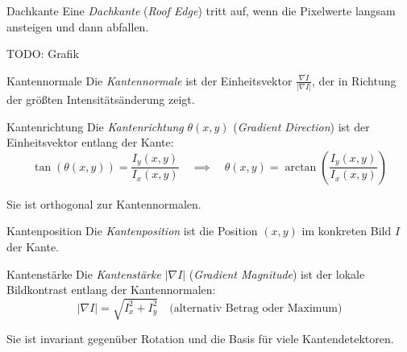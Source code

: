 \begin{example}[Kante]{Dachkante}
    Eine \emph{Dachkante} (\emph{Roof Edge}) tritt auf, wenn die Pixelwerte langsam ansteigen und dann abfallen.

    TODO: Grafik
\end{example}

\begin{defi}{Kantennormale}
    Die \emph{Kantennormale} ist der Einheitsvektor $\frac{\nabla I}{| \nabla I |}$, der in Richtung der größten Intensitätsänderung zeigt.
\end{defi}

\begin{defi}{Kantenrichtung}
    Die \emph{Kantenrichtung} $\theta(x, y)$ (\emph{Gradient Direction}) ist der Einheitsvektor entlang der Kante:
    \[
        \tan (\theta(x, y)) = \frac{I_y(x, y)}{I_x(x, y)} \quad \implies \quad \theta(x, y) = \arctan \left( \frac{I_y(x, y)}{I_x(x, y)} \right)
    \]

    Sie ist orthogonal zur Kantennormalen.
\end{defi}

\begin{defi}{Kantenposition}
    Die \emph{Kantenposition} ist die Position $(x, y)$ im konkreten Bild $I$ der Kante.
\end{defi}

\begin{defi}{Kantenstärke}
    Die \emph{Kantenstärke} $| \nabla I |$ (\emph{Gradient Magnitude}) ist der lokale Bildkontrast entlang der Kantennormalen:
    \[
        | \nabla I | = \sqrt{I_x^2 + I_y^2} \quad \text{(alternativ Betrag oder Maximum)}
    \]

    Sie ist invariant gegenüber Rotation und die Basis für viele Kantendetektoren.
\end{defi}

